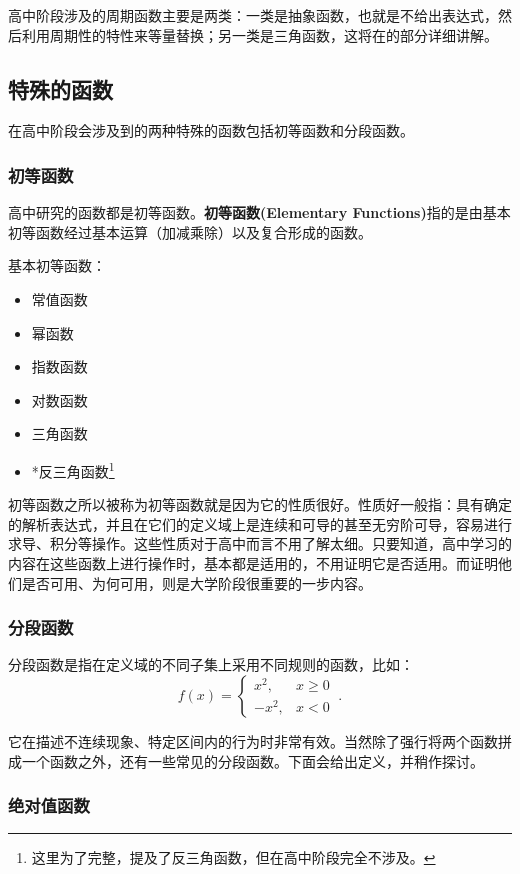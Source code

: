高中阶段涉及的周期函数主要是两类：一类是抽象函数，也就是不给出表达式，然后利用周期性的特性来等量替换；另一类是三角函数，这将在的部分详细讲解。

\subsection{特殊的函数}

在高中阶段会涉及到的两种特殊的函数包括初等函数和分段函数。

\subsubsection{初等函数}

高中研究的函数都是初等函数。\textbf{初等函数(Elementary Functions)}指的是由基本初等函数经过基本运算（加减乘除）以及复合形成的函数。

基本初等函数：
\begin{itemize}
\item 常值函数
\item 幂函数
\item 指数函数
\item 对数函数
\item 三角函数
\item *反三角函数\footnote{这里为了完整，提及了反三角函数，但在高中阶段完全不涉及。}
\end{itemize}

初等函数之所以被称为初等函数就是因为它的性质很好。性质好一般指：具有确定的解析表达式，并且在它们的定义域上是连续和可导的甚至无穷阶可导，容易进行求导、积分等操作。这些性质对于高中而言不用了解太细。只要知道，高中学习的内容在这些函数上进行操作时，基本都是适用的，不用证明它是否适用。而证明他们是否可用、为何可用，则是大学阶段很重要的一步内容。

\subsubsection{分段函数}

分段函数是指在定义域的不同子集上采用不同规则的函数，比如：
$$f(x) =
\begin{cases}
x^2, & x \geq 0 \\
-x^2, & x < 0
\end{cases}~.$$

它在描述不连续现象、特定区间内的行为时非常有效。当然除了强行将两个函数拼成一个函数之外，还有一些常见的分段函数。下面会给出定义，并稍作探讨。

\subsubsection{绝对值函数}

